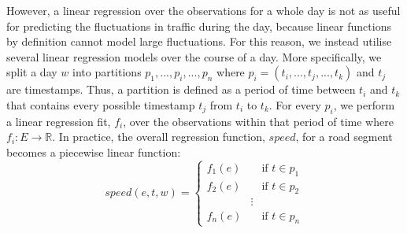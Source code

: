 However, a linear regression over the observations for a whole day is not as useful for predicting the fluctuations in traffic during the day, because linear functions by definition cannot model large fluctuations. For this reason, we instead utilise several linear regression models over the course of a day. More specifically, we split a day $w$ into partitions $p_1,...,p_i,...,p_n$ where $p_i = (t_i,...,t_j,...,t_k)$ and $t_j$ are timestamps. Thus, a partition is defined as a period of time between $t_i$ and $t_k$ that contains every possible timestamp $t_j$ from $t_i$ to $t_k$. For every $p_i$, we perform a linear regression fit, $f_i$, over the observations within that period of time where $f_i:E \rightarrow \mathbb{R}$. In practice, the overall regression function, $speed$, for a road segment becomes a piecewise linear function:
\begin{equation}\label{eq:speed-piecewise}
speed(e,t, w) =
\begin{cases}
f_1(e)       & \quad \text{if } t \in p_1\\
f_2(e)  & \quad \text{if } t \in p_2\\
&\vdots\\
f_n(e) & \quad \text{if } t \in p_n
\end{cases}
\end{equation}

